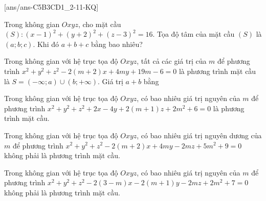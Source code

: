 [ans/ans-C5B3CD1_2-11-KQ]
\TNSA
\begin{ex}%
	Trong không gian $Oxyz$, cho mặt cầu $(S)\colon (x-1)^2+(y+2)^2+(z-3)^2=16$. Tọa độ tâm của mặt cầu $(S)$ là $(a;b;c)$. Khi đó $a+b+c$ bằng bao nhiêu?
\end{ex}
\begin{ex}%
	Trong không gian với hệ trục tọa độ $Oxyz$, tất cả các giá trị của $m$ để phương trình $x^2+y^2+z^2-2(m+2)x+4my+19m-6=0$ là phương trình mặt cầu là $S=(-\infty;a)\cup(b;+\infty)$. Giá trị $a+b$ bằng
\end{ex}
\begin{ex}%
	Trong không gian với hệ trục tọa độ $Oxyz$, có bao nhiêu giá trị nguyên của $m$ để phương trình $x^2+y^2+z^2+2x-4y+2(m+1)z+2m^2+6=0$ là phương trình mặt cầu.
\end{ex}
\begin{ex}%
	Trong không gian với hệ trục tọa độ $Oxyz$, có bao nhiêu giá trị nguyên dương của $m$ để phương trình $x^2+y^2+z^2-2(m+2)x+4my-2mz+5m^2+9=0$ không phải là phương trình mặt cầu.
\end{ex}
\begin{ex}%
	Trong không gian với hệ trục tọa độ $Oxyz$, có bao nhiêu giá trị nguyên của $m$ để phương trình $x^2+y^2+z^2-2(3-m)x-2(m+1)y-2mz+2m^2+7=0$ không phải là phương trình mặt cầu.
\end{ex}
